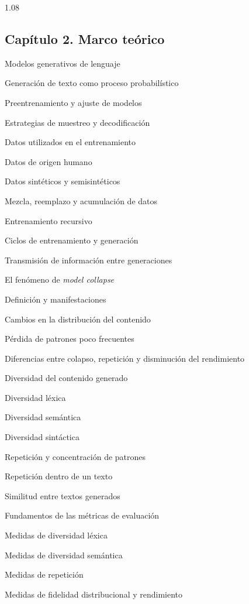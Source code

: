 \documentclass[12pt,letterpaper]{article}
\newcommand{\numerocap}{1}
\newcommand{\capitulo}[2]{\renewcommand{\numerocap}{#1}\Needspace{5\baselineskip}\subsection*{Capítulo #1. #2}}
\begin{document}
\begin{spacing}{1.08}
\capitulo{2}{Marco teórico}
\begin{apartados}
\item Modelos generativos de lenguaje
\begin{apartados}
\item Generación de texto como proceso probabilístico
\item Preentrenamiento y ajuste de modelos
\item Estrategias de muestreo y decodificación
\end{apartados}
\item Datos utilizados en el entrenamiento
\begin{apartados}
\item Datos de origen humano
\item Datos sintéticos y semisintéticos
\item Mezcla, reemplazo y acumulación de datos
\end{apartados}
\item Entrenamiento recursivo
\begin{apartados}
\item Ciclos de entrenamiento y generación
\item Transmisión de información entre generaciones
\end{apartados}
\item El fenómeno de \textit{model collapse}
\begin{apartados}
\item Definición y manifestaciones
\item Cambios en la distribución del contenido
\item Pérdida de patrones poco frecuentes
\item Diferencias entre colapso, repetición y disminución del rendimiento
\end{apartados}
\item Diversidad del contenido generado
\begin{apartados}
\item Diversidad léxica
\item Diversidad semántica
\item Diversidad sintáctica
\end{apartados}
\item Repetición y concentración de patrones
\begin{apartados}
\item Repetición dentro de un texto
\item Similitud entre textos generados
\end{apartados}
\item Fundamentos de las métricas de evaluación
\begin{apartados}
\item Medidas de diversidad léxica
\item Medidas de diversidad semántica
\item Medidas de repetición
\item Medidas de fidelidad distribucional y rendimiento
\end{apartados}
\end{apartados}


\end{spacing}
\end{document}
